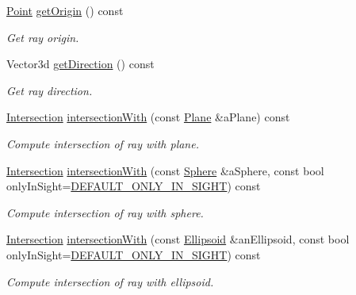 \begin{DoxyCompactItemize}
\hyperlink{classostk_1_1math_1_1geom_1_1d3_1_1objects_1_1_point}{Point} \hyperlink{classostk_1_1math_1_1geom_1_1d3_1_1objects_1_1_ray_a8c47fac4d487986b538b8168484527c2}{get\+Origin} () const
\begin{DoxyCompactList}\small\item\em Get ray origin. \end{DoxyCompactList}\item 
Vector3d \hyperlink{classostk_1_1math_1_1geom_1_1d3_1_1objects_1_1_ray_a986aa3d13740b411f72115503b1c9a72}{get\+Direction} () const
\begin{DoxyCompactList}\small\item\em Get ray direction. \end{DoxyCompactList}\item 
\hyperlink{classostk_1_1math_1_1geom_1_1d3_1_1_intersection}{Intersection} \hyperlink{classostk_1_1math_1_1geom_1_1d3_1_1objects_1_1_ray_aa4625c2dfe200ab9df245d2a4dc92f64}{intersection\+With} (const \hyperlink{classostk_1_1math_1_1geom_1_1d3_1_1objects_1_1_plane}{Plane} \&a\+Plane) const
\begin{DoxyCompactList}\small\item\em Compute intersection of ray with plane. \end{DoxyCompactList}\item 
\hyperlink{classostk_1_1math_1_1geom_1_1d3_1_1_intersection}{Intersection} \hyperlink{classostk_1_1math_1_1geom_1_1d3_1_1objects_1_1_ray_ad51ec740a903fc78304898a08d28103b}{intersection\+With} (const \hyperlink{classostk_1_1math_1_1geom_1_1d3_1_1objects_1_1_sphere}{Sphere} \&a\+Sphere, const bool only\+In\+Sight=\hyperlink{_sphere_8hpp_af424617f7c785f4835e2feba5a5640f2}{D\+E\+F\+A\+U\+L\+T\+\_\+\+O\+N\+L\+Y\+\_\+\+I\+N\+\_\+\+S\+I\+G\+HT}) const
\begin{DoxyCompactList}\small\item\em Compute intersection of ray with sphere. \end{DoxyCompactList}\item 
\hyperlink{classostk_1_1math_1_1geom_1_1d3_1_1_intersection}{Intersection} \hyperlink{classostk_1_1math_1_1geom_1_1d3_1_1objects_1_1_ray_abc3d3b69f26e6a43e9b10b55e0fc8a45}{intersection\+With} (const \hyperlink{classostk_1_1math_1_1geom_1_1d3_1_1objects_1_1_ellipsoid}{Ellipsoid} \&an\+Ellipsoid, const bool only\+In\+Sight=\hyperlink{_sphere_8hpp_af424617f7c785f4835e2feba5a5640f2}{D\+E\+F\+A\+U\+L\+T\+\_\+\+O\+N\+L\+Y\+\_\+\+I\+N\+\_\+\+S\+I\+G\+HT}) const
\begin{DoxyCompactList}\small\item\em Compute intersection of ray with ellipsoid. \end{DoxyCompactList}\item 

\end{DoxyCompactItemize}

